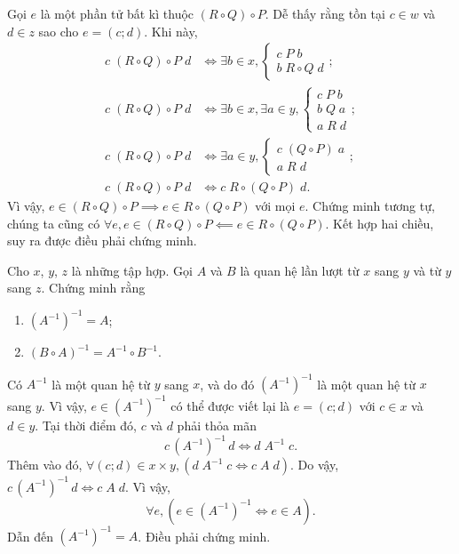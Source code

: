 Gọi $e$ là một phần tử bất kì thuộc $(R\circ Q) \circ P$. Dễ thấy rằng tồn tại $c \in w$ và $d \in z$ sao cho $e = (c; d)$. Khi này,
\begin{align*}
   c\;(R\circ Q) \circ P\;d &\iff \exists b \in x, \begin{cases}
      c\;P\;b \\
      b\;R\circ Q\;d
   \end{cases};\\
   c\;(R\circ Q) \circ P\;d &\iff \exists b \in x, \exists a\in y, \begin{cases}
      c\;P\;b \\
      b\;Q\;a \\
      a\;R\;d
   \end{cases}; \\
   c\;(R\circ Q) \circ P\;d &\iff \exists a\in y, \begin{cases}
      c\;(Q\circ P)\;a \\
      a\;R\;d
   \end{cases}; \\
   c\;(R\circ Q) \circ P\;d &\iff c\;R\circ (Q \circ P)\;d.
\end{align*} 
Vì vậy, $e \in (R\circ Q) \circ P \implies e \in R\circ (Q \circ P)$ với mọi $e$. Chứng minh tương tự, chúng ta cũng có $\forall e, e \in (R\circ Q) \circ P \impliedby e \in R\circ (Q \circ P)$. Kết hợp hai chiều, suy ra được điều phải chứng minh.

\exercise Cho $x$, $y$, $z$ là những tập hợp. Gọi $A$ và $B$ là quan hệ lần lượt từ $x$ sang $y$ và từ $y$ sang $z$. Chứng minh rằng
\begin{enumerate}
   \item $\left(A^{-1}\right)^{-1} = A$;
   \item $(B \circ A)^{-1} = A^{-1}\circ B^{-1}$.
\end{enumerate}

\solution

\resetSubexercise Có $A^{-1}$ là một quan hệ từ $y$ sang $x$, và do đó $\left(A^{-1}\right)^{-1}$ là một quan hệ từ $x$ sang $y$. Vì vậy, $e \in \left(A^{-1}\right)^{-1}$ có thể được viết lại là $e = (c; d)$ với $c \in x$ và $d \in y$. Tại thời điểm đó, $c$ và $d$ phải thỏa mãn
\begin{equation*}
   c\,\left(A^{-1}\right)^{-1}\,d \iff d\;A^{-1}\;c. 
\end{equation*}
Thêm vào đó, $\forall (c;d) \in x \times y, \left(d\;A^{-1}\;c \iff c\;A\;d\right)$. Do vậy, $c\,\left(A^{-1}\right)^{-1}\,d \iff c\;A\;d$. Vì vậy, \begin{equation*}
   \forall e, \left(e \in \left(A^{-1}\right)^{-1} \iff e \in A\right).
\end{equation*}
Dẫn đến $\left(A^{-1}\right)^{-1} = A$. Điều phải chứng minh.

